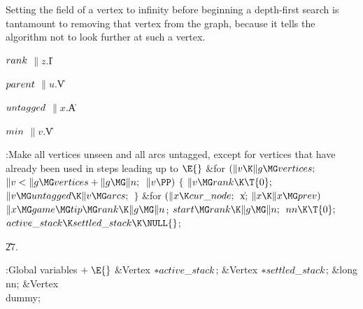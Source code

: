 Setting the  field of a vertex to infinity before beginning
a depth-first search is tantamount to removing that vertex from
the graph, because it tells the algorithm not to look further at
such a vertex.

\Y\B\4\D$\\{rank}$ \5
$\|z.{}$\|I\par
\B\4\D$\\{parent}$ \5
$\|u.{}$\|V\par
\B\4\D$\\{untagged}$ \5
$\|x.{}$\|A\par
\B\4\D$\\{min}$ \5
$\|v.{}$\|V%
\par
\Y\B\4:Make all vertices unseen and all arcs untagged, except for vertices
that have already been used in steps leading up to \X${}\E{}$%
\6
\&{for} ${}(\|v\K\|g\MG\\{vertices};{}$ ${}\|v<\|g\MG\\{vertices}+\|g\MG\|n;{}$
${}\|v\PP){}$\5
${}\{{}$\1\6
${}\|v\MG\\{rank}\K\T{0};{}$\6
${}\|v\MG\\{untagged}\K\|v\MG\\{arcs};{}$\6
\4${}\}{}$\2\6
\&{for} ${}(\|x\K\\{cur\_node};{}$ \|x; ${}\|x\K\|x\MG\\{prev}){}$\1\5
${}\|x\MG\\{game}\MG\\{tip}\MG\\{rank}\K\|g\MG\|n{}$;\2\6
${}\\{start}\MG\\{rank}\K\|g\MG\|n;{}$\6
${}\\{nn}\K\T{0};{}$\6
${}\\{active\_stack}\K\\{settled\_stack}\K\NULL{}$;\par
\U27.\fi

\B{}:Global variables\X${}\mathrel+\E{}$\6
\&{Vertex} ${}{*}\\{active\_stack}{}$;\6
\&{Vertex} ${}{*}\\{settled\_stack}{}$;\6
\&{long} \\{nn};\6
\&{Vertex} \\{dummy};\par
\fi

